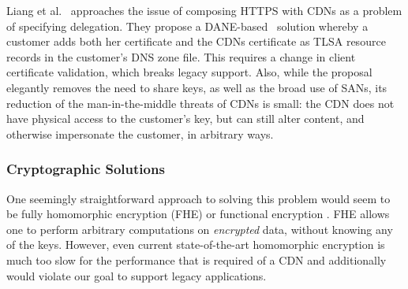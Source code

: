 Liang et al.~\cite{when-https-meets-cdn} approaches the issue of composing
HTTPS with CDNs as a problem of specifying delegation.  
%
%
They propose a DANE-based~\cite{DANE} solution whereby a customer adds both
her certificate and the CDNs certificate as TLSA resource records in the
customer's DNS zone file.  This requires a change in client certificate validation, which breaks legacy support.
%
%
Also, while the proposal elegantly removes the need to share keys, as well as the
broad use of SANs, its reduction of the man-in-the-middle threats of
CDNs is small: the CDN does not have physical access to the customer's key,
but can still alter content, and otherwise impersonate the customer, in
arbitrary ways.  
%

\subsubsection{Cryptographic Solutions}

One seemingly straightforward approach to solving this problem would seem to be
fully homomorphic encryption (FHE) or functional encryption
\cite{gentry2009fully, gentry2010computing, garg2016candidate}.  FHE allows one
to perform arbitrary computations on \textit{encrypted} data, without knowing
any of the keys.  However, even current state-of-the-art homomorphic encryption
is much too slow for the performance that is required of a CDN and additionally
would violate our goal to support legacy applications.

